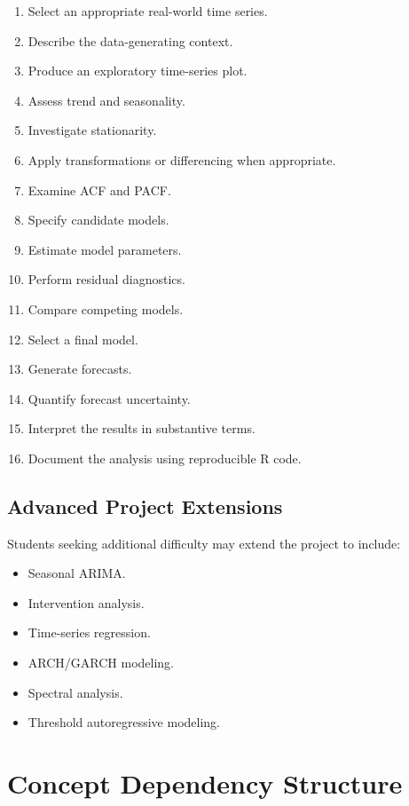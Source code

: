 \documentclass[11pt,a4paper]{article}
\begin{document}
\begin{enumerate}
    \item Select an appropriate real-world time series.
    \item Describe the data-generating context.
    \item Produce an exploratory time-series plot.
    \item Assess trend and seasonality.
    \item Investigate stationarity.
    \item Apply transformations or differencing when appropriate.
    \item Examine ACF and PACF.
    \item Specify candidate models.
    \item Estimate model parameters.
    \item Perform residual diagnostics.
    \item Compare competing models.
    \item Select a final model.
    \item Generate forecasts.
    \item Quantify forecast uncertainty.
    \item Interpret the results in substantive terms.
    \item Document the analysis using reproducible R code.
\end{enumerate}

\subsection{Advanced Project Extensions}

Students seeking additional difficulty may extend the project to include:

\begin{itemize}
    \item Seasonal ARIMA.
    \item Intervention analysis.
    \item Time-series regression.
    \item ARCH/GARCH modeling.
    \item Spectral analysis.
    \item Threshold autoregressive modeling.
\end{itemize}

\section{Concept Dependency Structure}
\end{document}
